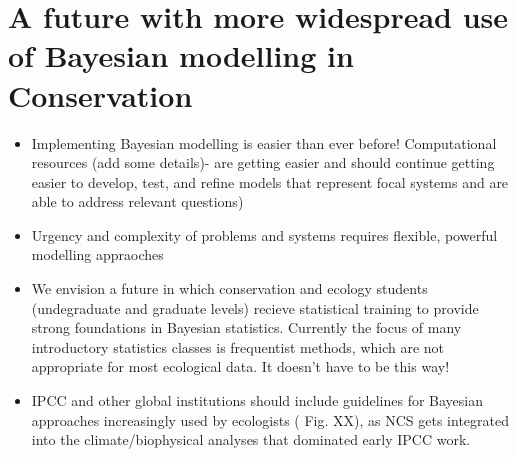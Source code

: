 \documentclass{article}
\begin{document}
\section* {A future with more widespread use of Bayesian modelling in Conservation}
\begin{itemize}
\item Implementing Bayesian modelling is easier than ever before! Computational resources (add some details)- are getting easier and should continue getting easier to develop, test, and refine models that represent focal systems and are able to address relevant questions)
\item Urgency and complexity of problems and systems requires flexible, powerful modelling appraoches 
\item We envision a future in which conservation and ecology students (undegraduate and graduate levels) recieve statistical training to provide strong foundations in Bayesian statistics. Currently the focus of many introductory statistics classes is frequentist methods, which are not appropriate for most ecological data. It doesn't have to be this way! 
\item IPCC and other global institutions should include guidelines for Bayesian approaches increasingly used by ecologists ( Fig. XX), as NCS gets integrated into the climate/biophysical analyses that dominated early IPCC work.
\end{itemize}

\par 
\end{document}
